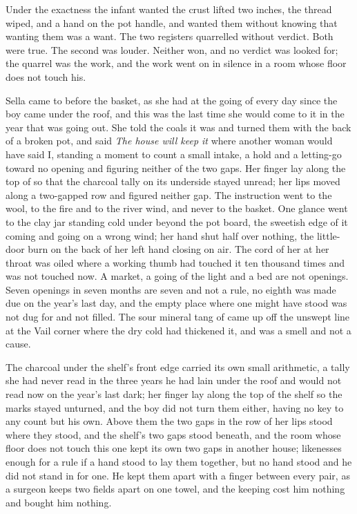 Under the exactness the infant wanted the crust lifted two inches, the thread wiped, and a hand on the pot handle, and wanted them without knowing that wanting them was a want. The two registers quarrelled without verdict. Both were true. The second was louder. Neither won, and no verdict was looked for; the quarrel was the work, and the work went on in silence in a room whose floor does not touch his.

Sella came to  before the basket, as she had at the going of every day since the boy came under the roof, and this was the last time she would come to it in the year that was going out. She told the coals it was  and turned them with the back of a broken pot, and said \emph{The house will keep it} where another woman would have said I, standing a moment to count a small intake, a hold and a letting-go toward no opening and figuring neither of the two gaps. Her finger lay along the top of  so that the charcoal tally on its underside stayed unread; her lips moved along a two-gapped row and figured neither gap. The instruction went to the wool, to the fire and to the river wind, and never to the basket. One glance went to the clay jar standing cold under  beyond the pot board, the sweetish edge of it coming and going on a wrong wind; her hand shut half over nothing, the little-door burn on the back of her left hand closing on air. The cord of her  at her throat was oiled where a working thumb had touched it ten thousand times and was not touched now. A market, a going of the light and a bed are not openings. Seven openings in seven months are seven and not a rule, no eighth was made due on the year's last day, and the empty place where one might have stood was not dug for and not filled. The sour mineral tang of  came up off the unswept line at the Vail corner where the dry cold had thickened it, and was a smell and not a cause.

The charcoal under the shelf's front edge carried its own small arithmetic, a tally she had never read in the three years he had lain under the roof and would not read now on the year's last dark; her finger lay along the top of the shelf so the marks stayed unturned, and the boy did not turn them either, having no key to any count but his own. Above them the two gaps in the row of her lips stood where they stood, and the shelf's two gaps stood beneath, and the room whose floor does not touch this one kept its own two gaps in another house; likenesses enough for a rule if a hand stood to lay them together, but no hand stood and he did not stand in for one. He kept them apart with a finger between every pair, as a surgeon keeps two fields apart on one towel, and the keeping cost him nothing and bought him nothing.

